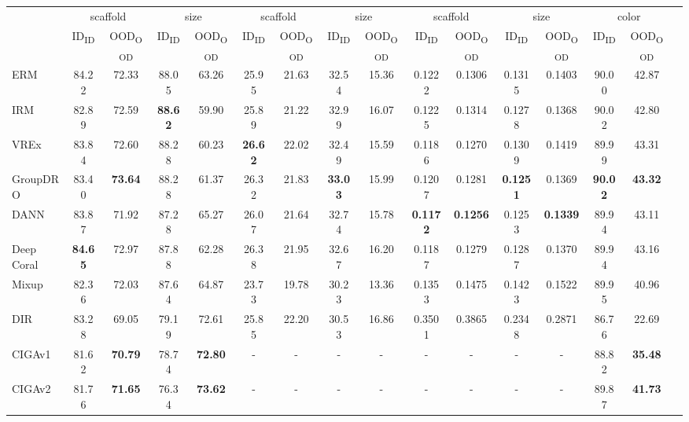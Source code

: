 \documentclass{article}
\begin{document}
\begin{table}[ht]
{\begin{tabular}{lllccccccccccccccc}
    & & & \multicolumn{2}{c}{scaffold} & \multicolumn{2}{c}{size} & \multicolumn{2}{c}{scaffold} & \multicolumn{2}{c}{size} & \multicolumn{2}{c}{scaffold} & \multicolumn{2}{c}{size} & \multicolumn{2}{c}{color}  &\\
    \cmidrule(r){4-5} \cmidrule(r){6-7} \cmidrule(r){8-9} \cmidrule(r){10-11} \cmidrule(r){12-13} \cmidrule(r){14-15} \cmidrule(r){16-17}
    & & & \multicolumn{1}{c}{ID\textsubscript{ID}} & \multicolumn{1}{c}{OOD\textsubscript{OOD}} & \multicolumn{1}{c}{ID\textsubscript{ID}} & \multicolumn{1}{c}{OOD\textsubscript{OOD}} & \multicolumn{1}{c}{ID\textsubscript{ID}} & \multicolumn{1}{c}{OOD\textsubscript{OOD}} & \multicolumn{1}{c}{ID\textsubscript{ID}} & \multicolumn{1}{c}{OOD\textsubscript{OOD}} & \multicolumn{1}{c}{ID\textsubscript{ID}} & \multicolumn{1}{c}{OOD\textsubscript{OOD}} & \multicolumn{1}{c}{ID\textsubscript{ID}} & \multicolumn{1}{c}{OOD\textsubscript{OOD}} & \multicolumn{1}{c}{ID\textsubscript{ID}} & \multicolumn{1}{c}{OOD\textsubscript{OOD}}  &\\
    \cmidrule(r){1-17}
    
    \multicolumn{3}{l}{ERM} & {84.22} & 72.33 & 88.05 & 63.26 & 25.95 & 21.63 & 32.54 & 15.36 & 0.1222 & 0.1306 & 0.1315 & 0.1403 & 90.00 & 42.87  &\\
    \multicolumn{3}{l}{IRM} & 82.89 & 72.59 & \textbf{88.62} & 59.90 & 25.89 & 21.22 & {32.99} & {16.07} & 0.1225 & 0.1314 & 0.1278 & {0.1368} & {90.02} & 42.80  &\\
    \multicolumn{3}{l}{VREx} & 83.84 & 72.60 & {88.28} & 60.23 & \textbf{26.62} & {22.02} & 32.49 & 15.59 & {0.1186} & {0.1270} & 0.1309 & 0.1419 & 89.99 & {43.31}  &\\
    \multicolumn{3}{l}{GroupDRO} & 83.40 & \textbf{73.64} & {88.28} & 61.37 & 26.32 & 21.83 & \textbf{33.03} & 15.99 & 0.1207 & 0.1281 & \textbf{0.1251} & 0.1369 & \textbf{90.02} & \textbf{43.32}  &\\
    \multicolumn{3}{l}{DANN} & 83.87 & 71.92 & 87.28 & {65.27} & 26.07 & 21.64 & 32.74 & 15.78 & \textbf{0.1172} & \textbf{0.1256} & {0.1253} & \textbf{0.1339} & 89.94 & 43.11  &\\
    \multicolumn{3}{l}{Deep Coral} & \textbf{84.65} & {72.97} & 87.88 & 62.28 & {26.38} & {21.95} & 32.67 & {16.20} & 0.1187 & 0.1279 & 0.1287 & 0.1370 & 89.94 & 43.16  &\\
    \cmidrule(r){1-17}
    \multicolumn{3}{l}{Mixup} & 82.36 & 72.03 & 87.64 & {64.87} & 23.73 & 19.78 & 30.23 & 13.36 & 0.1353 & 0.1475 & 0.1423 & 0.1522 & 89.95 & 40.96  &\\
    \multicolumn{3}{l}{DIR} & 83.28 & 69.05 & 79.19 & 72.61 & 25.85 & 22.20 & 30.53 & 16.86 & 0.3501 & 0.3865 & 0.2348 & 0.2871 & 86.76 & 22.69  &\\
    \multicolumn{3}{l}{CIGAv1} & 81.62 & \textbf{70.79} & 78.74 & \textbf{72.80} &- & - & - & - & -&-&-&- & 88.82 & \textbf{35.48}  &\\
    \multicolumn{3}{l}{CIGAv2} & 81.76 & \textbf{71.65} & 76.34 & \textbf{73.62} & -& - & - & - & -&-&-&- & 89.87 & \textbf{41.73}  &\\


\end{tabular}}
\end{table}
\end{document}
